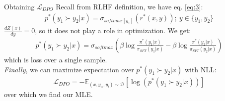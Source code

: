 \documentclass{beamer}
\begin{document}
\begin{frame}{Obtaining $\mathcal{L}_{DPO}$}
	Recall from RLHF definition, we have eq. \eqref{eq:3}:
	\begin{gather}
		p^*(y_1 \succ y_2 | x) = \sigma_{softmax[y_1]}(r^*(x,y));~y \in \{y_1, y_2 \} \tag{3}
	\end{gather}
	$\frac{d Z(x)}{dy} = 0$, so it does not play a role in optimization. \pause We get:
	\begin{gather}
		p^*(y_1 \succ y_2 | x) = \sigma_{softmax}\left( \beta \log \frac{\pi^*(y_1|x)}{\pi_{SFT}(y_1|x)} - \beta \log \frac{\pi^*(y_2|x)}{\pi_{SFT}(y_2|x)} \right)
	\end{gather}
	which is loss over a single sample. \pause \newline \\

	\textit{Finally}, we can maximize expectation over $p^*(y_1 \succ y_2 | x)$ with NLL:
	\begin{gather}
		\mathcal{L}_{DPO} = - \mathbb{E}_{(x,y_w,y_l) \sim \mathcal{D}} [ \log (p^*(y_1 \succ y_2 | x)) ] 
	\end{gather}
	over which we find our MLE.
\end{frame}
\end{document}
